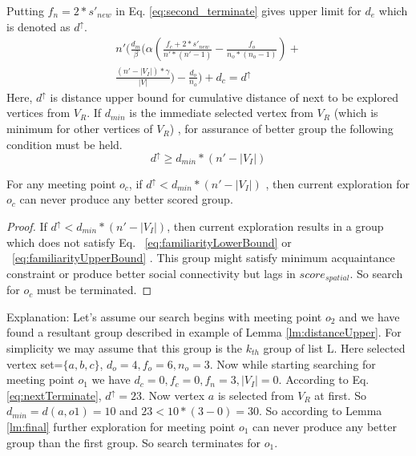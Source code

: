 \documentclass{vldb}
\begin{document}
		Putting $ f_n=2*s'_{new} $ in Eq. \eqref{eq:second_terminate} gives  upper limit for $ d_{e} $ which is denoted as $ d^\uparrow $.
		\begin{equation}
		\label{eq:nextTerminate}
		\begin{split}
		n'\Bigg(\frac{d_{m}}{\beta}\bigg(\alpha \left(\frac{f_{c}+2*s'_{new}}{n'*(n'-1)}-\frac{f_o}{n_o*(n_o-1)}\right)+
		\\
		\frac{(n'-|V_I|)*\gamma}{|V|}\bigg)-\frac{d_o}{n_o}\Bigg)+d_{c}=d^\uparrow		
		\end{split}
		\end{equation}
		Here, $ d^\uparrow $ is distance upper bound for  cumulative distance  	of next to be explored vertices from $ V_R $. If $ d_{min} $ is the immediate selected vertex from $ V_R $ (which is minimum for other vertices of $ V_R $) , for assurance of better group the following condition must be held.
		\[
		d^\uparrow \geq d_{min}*(n'-|V_I|) 
		\]
		
		\begin{Lemma}
			\label{lm:final}
			For any meeting point $ o_{c} $, if $ d^\uparrow < d_{min}*(n'-|V_I|) $ , then current exploration for $ o_{c} $ can never produce any better scored group.
		\end{Lemma}
		
		\begin{proof}
		 If $ d^\uparrow < d_{min}*(n'-|V_I|) $, then current exploration results in a group which does not satisfy Eq. ~\ref{eq:familiarityLowerBound} or ~\ref{eq:familiarityUpperBound} . This group might satisfy minimum acquaintance constraint or produce better social connectivity but lags in $ score_{spatial} $. So search for $ o_{c} $ must be terminated.
		\end{proof}
		
		
		Explanation: Let's assume our search begins with meeting point $ o_{2} $ and we have found a resultant group described in example of Lemma \ref{lm:distanceUpper}. For simplicity we may assume that this group is the $ k_{th} $ group of list L. Here selected vertex set=$ \{a,b,c\} $, $ d_o=4,f_o=6,n_o=3 $. Now while starting searching for meeting point $ o_{1} $ we have $ d_{c}=0,f_{c}=0,f_{n}=3, |V_I|=0 $. According to Eq. \eqref{eq:nextTerminate}, $ d^\uparrow=23 $.  Now vertex $ a  $ is selected from $ V_R $ at first. So $ d_{min}=d(a,o1)=10 $ and $ 23 < 10*(3-0)=30 $. So according to Lemma \ref{lm:final} further exploration for meeting point $ o_{1} $ can never produce any better group than the first group. So search terminates for $ o_{1} $. 
		
\end{document}
